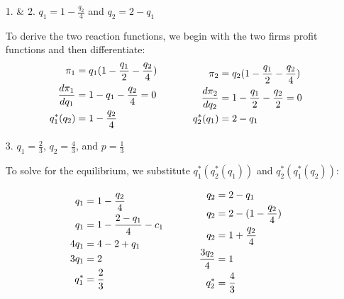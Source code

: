 \documentclass{article}
\newenvironment{solution}{\color{red}}{\color{black}}
\begin{document}
\begin{solution}
\begin{enumerate}
\item[1. \& 2.] $q_{1} = 1 - \frac{q_{2}}{4}$ and $q_{2} = 2 - q_{1}$

To derive the two reaction functions, we begin with the two firms profit functions and then differentiate:
\begin{equation*}
\begin{aligned}
\pi_{1} &= q_{1}(1-\frac{q_{1}}{2}-\frac{q_{2}}{4}) \\
\frac{d \pi_{1}}{d q_{1}} &= 1-q_{1}-\frac{q_{2}}{4} = 0 \\
q^{*}_{1}(q_{2}) &= 1 - \frac{q_{2}}{4} \\
\end{aligned}
\hspace{.5in}
\begin{aligned}
\pi_{2} &= q_{2}(1-\frac{q_{1}}{2} - \frac{q_{2}}{4}) \\
\frac{d \pi_{2}}{d q_{2}} &= 1-\frac{q_{1}}{2}-\frac{q_{2}}{2} = 0 \\
q^{*}_{2}(q_{1})&= 2 - q_{1} 
\end{aligned}
\end{equation*}

\item[3.] $q_{1} = \frac{2}{3}$, $q_{2} = \frac{4}{3}$, and $p=\frac{1}{3}$ 

To solve for the equilibrium, we substitute $q^{*}_{1}(q^{*}_{2}(q_{1}))$ and $q^{*}_{2}(q^{*}_{1}(q_{2}))$:

\begin{equation*}
\begin{aligned}
q_{1} &= 1 - \frac{q_{2}}{4}\\
q_{1} &= 1 - \frac{2 - q_{1}}{4} - c_{1} \\
4q_{1} &= 4-2+q_{1} \\
3q_{1} &= 2 \\
q_{1}^{*} &= \frac{2}{3}
\end{aligned}
\hspace{.5in}
\begin{aligned}
q_{2} &= 2 - q_{1}\\
q_{2} &= 2 - (1 - \frac{q_{2}}{4})  \\
q_{2} &= 1 + \frac{q_{2}}{4} \\ 
\frac{3q_{2}}{4} &= 1\\
q_{2}^{*} &= \frac{4}{3}
\end{aligned}
\end{equation*}


\end{enumerate}
\end{solution}
\end{document}
